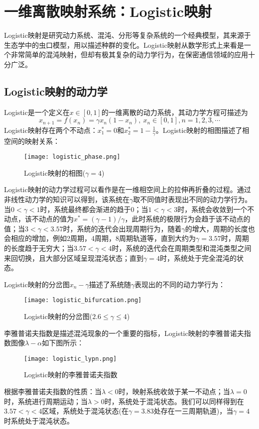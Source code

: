 \section{一维离散映射系统：Logistic映射}

Logistic映射是研究动力系统、混沌、分形等复杂系统的一个经典模型，其来源于生态学中的虫口模型，用以描述种群的变化。Logistic映射从数学形式上来看是一个非常简单的混沌映射，但却有极其复杂的动力学行为，在保密通信领域的应用十分广泛。

\subsection{Logistic映射的动力学}

Logistic是一个定义在$x\in [0,1]$的一维离散的动力系统，其动力学方程可描述为
\begin{equation}
    x_{n+1}=f(x_n)=\gamma x_n(1-x_n),\ x_n\in [0,1], n=1,2,3,\cdots
\end{equation}
Logistic映射存在两个不动点：$x_1^*=0$和$x_2^*=1-\frac{1}{\gamma}$。Logistic映射的相图描述了相空间的映射关系：
\begin{figure}[!b]
	\centering
	\texttt{[image: logistic\_phase.png]}
    \caption{Logistic映射的相图($\gamma=4$)}
    \label{fig:logi_pha}
\end{figure}

Logistic映射的动力学过程可以看作是在一维相空间上的拉伸再折叠的过程。通过非线性动力学的知识可以得到，该系统在$\gamma$取不同值时表现出不同的动力学行为。当$0<\gamma<1$时，系统最终都会渐进的趋于0；当$1<\gamma<3$时，系统会收敛到一个不动点，该不动点的值为$x^*=(\gamma-1)/\gamma$，此时系统的极限行为会趋于该不动点的值；当$3<\gamma<3.57$时，系统的迭代会出现周期行为，随着$\gamma$的增大，周期的长度也会相应的增加，例如2周期，4周期，8周期轨道等，直到大约为$\gamma=3.57$时，周期的长度趋于无穷大；当$3.57<\gamma<4$时，系统的迭代会在周期类型和混沌类型之间来回切换，且大部分区域呈现混沌状态；直到$\gamma=4$时，系统处于完全混沌的状态。

Logistic映射的分岔图$x_n-\gamma$描述了系统随$\gamma$表现出的不同的动力学行为：
\begin{figure}[!]
	\centering
	\texttt{[image: logistic\_bifurcation.png]}
    \caption{Logistic映射的分岔图($2.6\leqslant\gamma\leqslant 4$)}
    \label{fig:logi_pha}
\end{figure}

李雅普诺夫指数是描述混沌现象的一个重要的指标，Logistic映射的李雅普诺夫指数图像$\lambda-\alpha$如下图所示：
\begin{figure}[!]
	\centering
	\texttt{[image: logistic\_lypn.png]}
    \caption{Logistic映射的李雅普诺夫指数}
    \label{fig:logi_lypn}
\end{figure}
根据李雅普诺夫指数的性质：当$\lambda<0$时，映射系统收敛于某一不动点；当$\lambda=0$时，系统进行周期运动；当$\lambda>0$时，系统处于混沌状态。我们可以同样得到在$3.57<\gamma<4$区域，系统处于混沌状态(在$\gamma=3.83$处存在一三周期轨道)，当$\gamma=4$时系统处于混沌状态。


